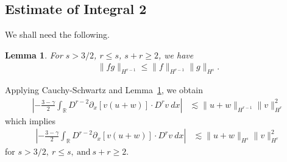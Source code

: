 \documentclass[12pt,reqno]{amsart}
\numberwithin{equation}{section}  %
\numberwithin{figure}{section}
\newcommand{\rr}{\mathbb{R}}
\newcommand{\p}{\partial}
\newtheorem{lemma}[theorem]{Lemma}
\begin{document}
\subsection{Estimate of Integral 2} We shall need the following.
%
%
%
%
%
%
%
%
\begin{lemma}
For $s > 3/2$, $r \le s$, $s + r \ge 2$, we have
%
%
\begin{equation*}
\begin{split}
  \| fg \|_{H^{r-1}} \le \| f \|_{H^{r-1}} \| g \|_{H^{s}}.
\end{split}
\end{equation*}
%
%
\label{lem:frac-deriv}
\end{lemma}
%
%
%
%
%
%
Applying Cauchy-Schwartz and Lemma~\ref{lem:frac-deriv}, we obtain
%
%
%
\begin{equation*}
\begin{split}
\left | - \frac{3-\gamma}{2} \int_{\rr}  D^{r -2}
\p_x[v(u+w)] \cdot
D^r v \ dx  \right |
 & \lesssim \|u+w\|_{H^{r -1}} \|v\|_{H^r}^2
\end{split}
\end{equation*}
%
%
which implies
\begin{equation}
\begin{split}
\left | - \frac{3-\gamma}{2} \int_{\rr}  D^{r -2}
\p_x[v(u+w)] \cdot
D^r v \ dx  \right |
 & \lesssim \|u+w\|_{H^{s}} \|v\|_{H^r}^2
 \label{3v}
\end{split}
\end{equation}
%
for $s > 3/2, \ r \le s, \ \text{and} \ s + r \ge 2$.
%
%
\end{document}
